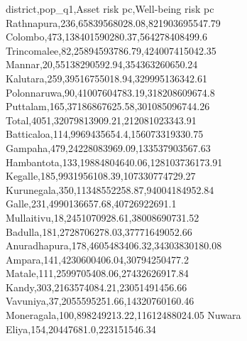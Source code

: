 district,pop_q1,Asset risk pc,Well-being risk pc
Rathnapura,236,65839568028.08,821903695547.79
Colombo,473,138401590280.37,564278408499.6
Trincomalee,82,25894593786.79,424007415042.35
Mannar,20,55138290592.94,354363260650.24
Kalutara,259,39516755018.94,329995136342.61
Polonnaruwa,90,41007604783.19,318208609674.8
Puttalam,165,37186867625.58,301085096744.26
Total,4051,32079813909.21,212081023343.91
Batticaloa,114,9969435654.4,156073319330.75
Gampaha,479,24228083969.09,133537903567.63
Hambantota,133,19884804640.06,128103736173.91
Kegalle,185,9931956108.39,107330774729.27
Kurunegala,350,11348552258.87,94004184952.84
Galle,231,4990136657.68,40726922691.1
Mullaitivu,18,2451070928.61,38008690731.52
Badulla,181,2728706278.03,37771649052.66
Anuradhapura,178,4605483406.32,34303830180.08
Ampara,141,4230600406.04,30794250477.2
Matale,111,2599705408.06,27432626917.84
Kandy,303,2163574084.21,23051491456.66
Vavuniya,37,2055595251.66,14320760160.46
Moneragala,100,898249213.22,11612488024.05
Nuwara Eliya,154,20447681.0,223151546.34
